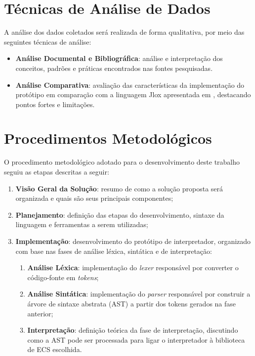\section{Técnicas de Análise de Dados}

A análise dos dados coletados será realizada de forma qualitativa, por meio das seguintes técnicas de análise:

\begin{itemize}
    \item \textbf{Análise Documental e Bibliográfica}: análise e interpretação dos conceitos, padrões e práticas encontrados nas fontes pesquisadas.
    \item \textbf{Análise Comparativa}: avaliação das características da implementação do protótipo em comparação com a linguagem Jlox apresentada em , destacando pontos fortes e limitações.
\end{itemize}

\section{Procedimentos Metodológicos}

O procedimento metodológico adotado para o desenvolvimento deste trabalho seguiu as etapas descritas a seguir:

\begin{enumerate}
    \item \textbf{Visão Geral da Solução}: resumo de como a solução proposta será organizada e quais são seus principais componentes;
    \item \textbf{Planejamento}: definição das etapas do desenvolvimento, sintaxe da linguagem e ferramentas a serem utilizadas;
    \item \textbf{Implementação}: desenvolvimento do protótipo de interpretador, organizado com base nas fases de análise léxica, sintática e de interpretação:
          \begin{enumerate}
              \item \textbf{Análise Léxica}: implementação do \textit{lexer} responsável por converter o código-fonte em \textit{tokens};
              \item \textbf{Análise Sintática}: implementação do \textit{parser} responsável por construir a árvore de sintaxe abstrata (AST) a partir dos tokens gerados na fase anterior;
              \item \textbf{Interpretação}: definição teórica da fase de interpretação, discutindo como a AST pode ser processada para ligar o interpretador à biblioteca de ECS escolhida.
          \end{enumerate}
\end{enumerate}